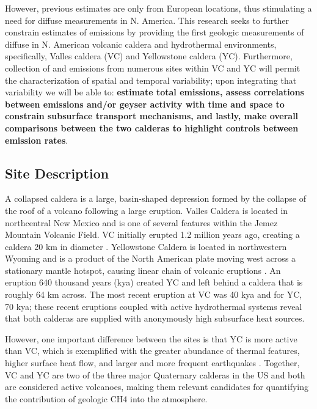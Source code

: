 	
	\vspace{3mm}  \par \noindent 
	However, previous estimates are only from European locations, thus stimulating a need for diffuse  measurements in N. America. This research seeks to further constrain estimates of  emissions by providing the first geologic measurements of diffuse  in N. American volcanic caldera and hydrothermal environments, specifically, Valles caldera (VC) and Yellowstone caldera (YC). Furthermore, collection of  and  emissions from numerous sites within VC and YC will permit the characterization of spatial and temporal variability; upon integrating that variability we will be able to: \textbf{estimate total emissions, assess correlations between emissions and/or geyser activity with time and space to constrain subsurface transport mechanisms, and lastly, make overall comparisons between the two calderas to highlight controls between emission rates}.
	
	\subsection{Site Description}
	A collapsed caldera is a large, basin-shaped depression formed by the collapse of the roof of a volcano following a large eruption. Valles Caldera is located in northcentral New Mexico and is one of several features within the Jemez Mountain Volcanic Field. VC initially erupted 1.2 million years ago, creating a caldera 20 km in diameter \citep{Goff2009}. Yellowstone Caldera is located in northwestern Wyoming and is a product of the North American plate moving west across a stationary mantle hotspot, causing linear chain of volcanic eruptions \citep{Smith1994}. An eruption 640 thousand years (kya) created YC and left behind a caldera that is roughly 64 km across. The most recent eruption at VC was 40 kya and for YC, 70 kya; these recent eruptions coupled with active hydrothermal systems reveal that both calderas are supplied with anonymously high subsurface heat sources. 
	
	\vspace{3mm}  \par \noindent	
	However, one important difference between the sites is that YC is more active than VC, which is exemplified with the greater abundance of thermal features, higher surface heat flow, and larger and more frequent earthquakes \citep{Lowenstern2008}. Together, VC and YC are two of the three major Quaternary calderas in the US and both are considered active volcanoes, making them relevant candidates for quantifying the contribution of geologic CH4 into the atmosphere.
	
